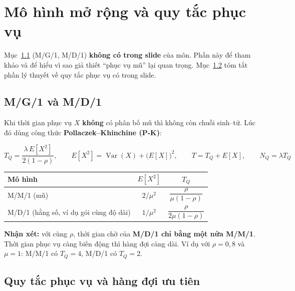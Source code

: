 \section{Mô hình mở rộng và quy tắc phục vụ}

\begin{luuy}[Phạm vi]
Mục~\ref{sec:mg1} (M/G/1, M/D/1) \textbf{không có trong slide} của môn. Phần này để tham khảo và để hiểu vì sao giả thiết “phục vụ mũ” lại quan trọng. Mục~\ref{sec:uutien} tóm tắt phần lý thuyết về quy tắc phục vụ có trong slide.
\end{luuy}

\subsection{M/G/1 và M/D/1}\label{sec:mg1}

Khi thời gian phục vụ $X$ \textbf{không} có phân bố mũ thì không còn chuỗi sinh--tử. Lúc đó dùng công thức \textbf{Pollaczek--Khinchine (P-K)}:

\begin{congthuc}[{Công thức P-K cho M/G/1 ($\rho = \lambda E[X] < 1$)}]
\[
T_Q = \frac{\lambda\,E[X^2]}{2(1-\rho)},\qquad E[X^2] = \operatorname{Var}(X) + \bigl(E[X]\bigr)^2,\qquad
T = T_Q + E[X],\qquad N_Q = \lambda T_Q
\]
\end{congthuc}

\begin{center}
\begin{tabular}{@{}l c c@{}}
\toprule
\textbf{Mô hình} & \textbf{$E[X^2]$} & \textbf{$T_Q$} \\
\midrule
M/M/1 (mũ) & $2/\mu^2$ & $\dfrac{\rho}{\mu(1-\rho)}$ \\[2mm]
M/D/1 (hằng số, ví dụ gói cùng độ dài) & $1/\mu^2$ & $\dfrac{\rho}{2\mu(1-\rho)}$ \\
\bottomrule
\end{tabular}
\end{center}

\textbf{Nhận xét:} với cùng $\rho$, thời gian chờ của \textbf{M/D/1 chỉ bằng một nửa M/M/1}. Thời gian phục vụ càng biến động thì hàng đợi càng dài. Ví dụ với $\rho=0{,}8$ và $\mu = 1$: M/M/1 có $T_Q = 4$, M/D/1 có $T_Q = 2$.

\subsection{Quy tắc phục vụ và hàng đợi ưu tiên}\label{sec:uutien}

